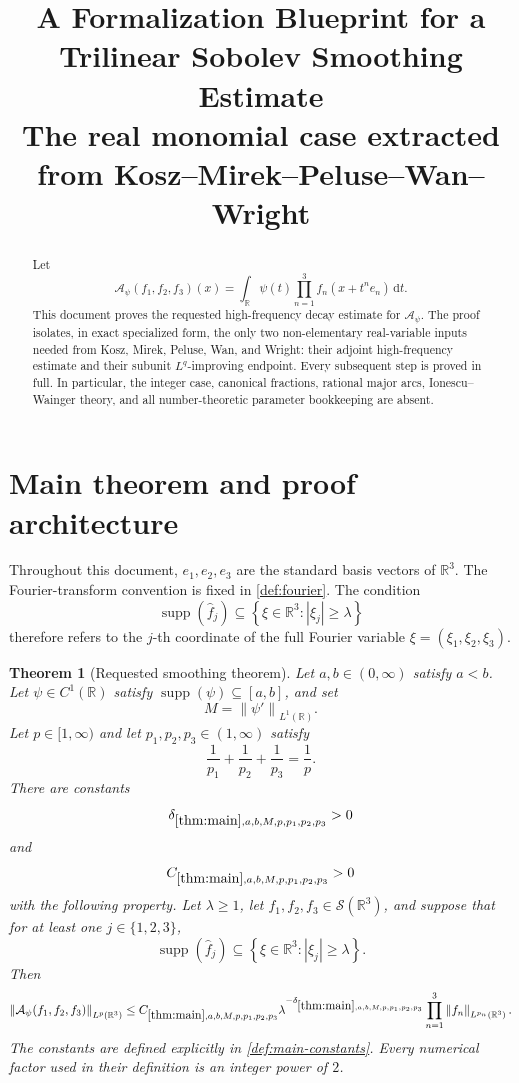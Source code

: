 \documentclass[11pt]{article}
\title{A Formalization Blueprint for a Trilinear Sobolev Smoothing Estimate\\
	\large The real monomial case extracted from Kosz--Mirek--Peluse--Wan--Wright}
\author{}
\date{}
\newtheorem{theorem}{Theorem}[section]
\newcommand{\R}{\mathbb{R}}
\newcommand{\Sch}{\mathcal{S}}
\newcommand{\supp}{\operatorname{supp}}
\newcommand{\A}{\mathcal{A}}
\newcommand{\dd}{\,\mathrm{d}}
\newcommand{\norm}[2]{\left\lVert #1\right\rVert_{#2}}
\newcommand{\Cst}[2]{C_{\ref{#1},#2}}
\newcommand{\Exp}[2]{\delta_{\ref{#1},#2}}
\newcommand{\abs}[1]{\left|#1\right|}
\newcommand{\set}[1]{\left\{#1\right\}}
\newcommand{\indices}{\{1,2,3\}}
\begin{document}
	\maketitle
	
	\begin{abstract}
		Let
		\[
		\A_{\psi}(f_1,f_2,f_3)(x)
		=
		\int_{\R}\psi(t)\prod_{n=1}^{3}f_n(x+t^n e_n)\dd t.
		\]
		This document proves the requested high-frequency decay estimate for \(\A_\psi\).  The proof isolates, in exact specialized form, the only two non-elementary real-variable inputs needed from Kosz, Mirek, Peluse, Wan, and Wright: their adjoint high-frequency estimate and their subunit \(L^q\)-improving endpoint.  Every subsequent step is proved in full.  In particular, the integer case, canonical fractions, rational major arcs, Ionescu--Wainger theory, and all number-theoretic parameter bookkeeping are absent.
	\end{abstract}
	
	\tableofcontents
	
	\section{Main theorem and proof architecture}
	
	Throughout this document, \(e_1,e_2,e_3\) are the standard basis vectors of \(\R^3\).  The Fourier-transform convention is fixed in \cref{def:fourier}.  The condition
	\[
	\supp(\widehat f_j)\subseteq\set{\xi\in\R^3:\abs{\xi_j}\geq\lambda}
	\]
	therefore refers to the \(j\)-th coordinate of the full Fourier variable \(\xi=(\xi_1,\xi_2,\xi_3)\).
	
	\begin{theorem}[Requested smoothing theorem]\label{thm:main}
		Let \(a,b\in(0,\infty)\) satisfy \(a<b\).  Let \(\psi\in C^1(\R)\) satisfy \(\supp(\psi)\subseteq[a,b]\), and set
		\[
		M=\norm{\psi'}{L^1(\R)}.
		\]
		Let \(p\in[1,\infty)\) and let \(p_1,p_2,p_3\in(1,\infty)\) satisfy
		\[
		\frac1{p_1}+\frac1{p_2}+\frac1{p_3}=\frac1p.
		\]
		There are constants
		\[
		\Exp{thm:main}{a,b,M,p,p_1,p_2,p_3}>0
		\]
		and
		\[
		\Cst{thm:main}{a,b,M,p,p_1,p_2,p_3}>0
		\]
		with the following property.  Let \(\lambda\geq1\), let \(f_1,f_2,f_3\in\Sch(\R^3)\), and suppose that for at least one \(j\in\indices\),
		\[
		\supp(\widehat f_j)\subseteq\set{\xi\in\R^3:\abs{\xi_j}\geq\lambda}.
		\]
		Then
		\[
		\norm{\A_\psi(f_1,f_2,f_3)}{L^p(\R^3)}
		\leq
		\Cst{thm:main}{a,b,M,p,p_1,p_2,p_3}
		\lambda^{-\Exp{thm:main}{a,b,M,p,p_1,p_2,p_3}}
		\prod_{n=1}^{3}\norm{f_n}{L^{p_n}(\R^3)}.
		\]
		The constants are defined explicitly in \cref{def:main-constants}.  Every numerical factor used in their definition is an integer power of \(2\).
	\end{theorem}
	
\end{document}
